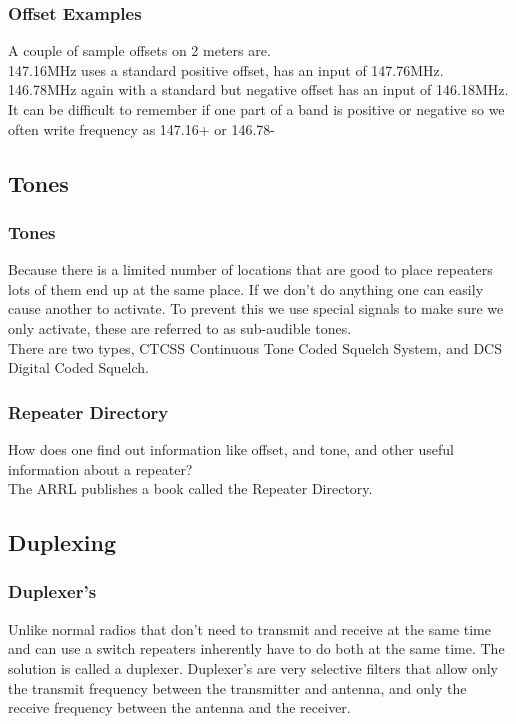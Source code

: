 \documentclass[10pt]{beamer}
\begin{document}
\begin{frame}
\frametitle{Offset Examples}
A couple of sample offsets on 2 meters are.\\
147.16MHz uses a standard positive offset, has an input of 147.76MHz.\\
146.78MHz again with a standard but negative offset has an input of 146.18MHz.\\
It can be difficult to remember if one part of a band is positive or negative so we often write frequency as 147.16+ or 146.78-
\end{frame}

\subsection{Tones}

\begin{frame}
\frametitle{Tones}
Because there is a limited number of locations that are good to place repeaters lots of them end up at the same place. If we don't do anything one can easily cause another to activate. To prevent this we use special signals to make sure we only activate, these are referred to as sub-audible tones.\\

There are two types, CTCSS Continuous Tone Coded Squelch System, and DCS Digital Coded Squelch.
\end{frame}

\begin{frame}
\frametitle{Repeater Directory}
How does one find out information like offset, and tone, and other useful information about a repeater?\\
The ARRL publishes a book called the Repeater Directory.
\end{frame}

\subsection{Duplexing}

\begin{frame}
\frametitle{Duplexer's}
Unlike normal radios that don't need to transmit and receive at the same time and can use a switch repeaters inherently have to do both at the same time. The solution is called a duplexer. Duplexer's are very selective filters that allow only the transmit frequency between the transmitter and antenna, and only the receive frequency between the antenna and the receiver.
\end{frame}
\end{document}
